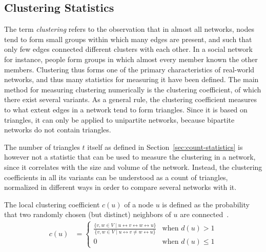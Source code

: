 \documentclass{article}
\begin{document}
\subsection{Clustering Statistics}
\label{sec:statistic:clustering}

The term \emph{clustering} refers to the observation that in almost all
networks, nodes tend to form small groups within which many edges are
present, and such that only few edges connected different clusters with
each other.  In a social network for instance, people form groups in
which almost every member known the other members.  Clustering thus
forms one of the primary characteristics of real-world networks, and
thus many statistics for measuring it have been defined.  The main
method for measuring clustering numerically is the clustering
coefficient, of which there exist several variants. As a general rule,
the clustering coefficient measures to what extent edges in a network
tend to form triangles. Since it is based on triangles, it can only be
applied to unipartite networks, because bipartite networks do not
contain triangles.

The number of triangles $t$ itself as defined in
Section~\ref{sec:count-statistics} is however not a statistic that can
be used to measure the clustering in a network, since it correlates with
the size and volume of the network.  Instead, the clustering
coefficients in all its variants can be understood as a count of
triangles, normalized in different ways in order to compare several
networks with it.

The local clustering coefficient $c(u)$ of a node $u$ is defined as the
probability that two randomly chosen (but distinct) neighbors of $u$ are
connected~\cite{b228}.
\begin{align}
  c(u) &= \left\{ \begin{array}{ll} \frac { \{ v, w \in V \mid u \leftrightarrow v
      \leftrightarrow w \leftrightarrow u \} } { \{ v, w \in V \mid u \leftrightarrow v \neq w \leftrightarrow u \}
    } & \text{when } d(u) > 1 \\ 0 & \text{when } d(u) \leq 1
          \end{array} \right. 
\end{align}
\end{document}
